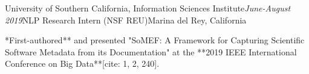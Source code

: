 \begin{rSubsection}{University of Southern California, Information Sciences Institute}{\em June-August 2019}{NLP Research Intern (NSF REU)}{Marina del Rey, California}
\item **First-authored** and presented "SoMEF: A Framework for Capturing Scientific Software Metadata from its Documentation" at the **2019 IEEE International Conference on Big Data**[cite: 1, 2, 240].
\end{rSubsection}